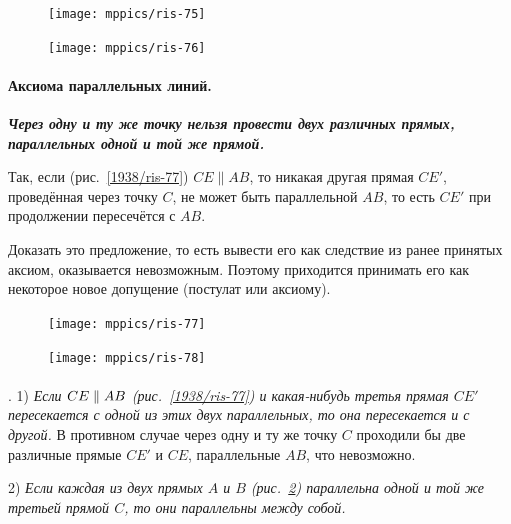 \documentclass[oneside]{book}
\begin{document}
\begin{figure}[h!]
\begin{minipage}{.32\textwidth}
\centering
\vskip 7mm
\texttt{[image: mppics/ris-75]}
\label{1938/ris-75}
\end{minipage}\hfill
\begin{minipage}{.54\textwidth}
\centering
\vskip -3mm
\texttt{[image: mppics/ris-76]}
\caption{}\label{1938/ris-76}
\end{minipage}
\end{figure}

\paragraph{Аксиома параллельных линий.}\label{1938/75}
\textbf{\emph{Через одну и ту же точку нельзя провести двух различных прямых, параллельных одной и той же прямой.}}

Так, если (рис.~\ref{1938/ris-77}) $CE\parallel AB$, то никакая другая прямая $CE'$, проведённая через точку $C$, не может быть параллельной $AB$, то есть $CE'$ при продолжении пересечётся с $AB$.

Доказать это предложение, то есть вывести его как следствие из ранее принятых аксиом, оказывается невозможным.
Поэтому приходится принимать его как некоторое новое допущение (постулат или аксиому).

\begin{figure}[h!]
\begin{minipage}{.48\textwidth}
\centering
\texttt{[image: mppics/ris-77]}
\caption{}\label{1938/ris-77}
\end{minipage}\hfill
\begin{minipage}{.48\textwidth}
\centering
\texttt{[image: mppics/ris-78]}
\caption{}\label{1938/ris-78}
\end{minipage}
\end{figure}

\paragraph{}\label{1938/76}
\mbox{.}
1) \emph{Если $CE\z\parallel AB$ \emph{(рис.~\ref{1938/ris-77})} и какая-нибудь третья прямая $CE'$ пересекается с одной из этих двух параллельных, то она пересекается и с другой.}
В противном случае через одну и ту же точку $C$ проходили бы две различные прямые $CE'$ и $CE$, параллельные $AB$, что невозможно.

2) \emph{Если каждая из двух прямых $A$ и $B$ \emph{(рис.~\ref{1938/ris-78})} параллельна одной и той же третьей прямой $C$, то они параллельны между собой.}
\end{document}
